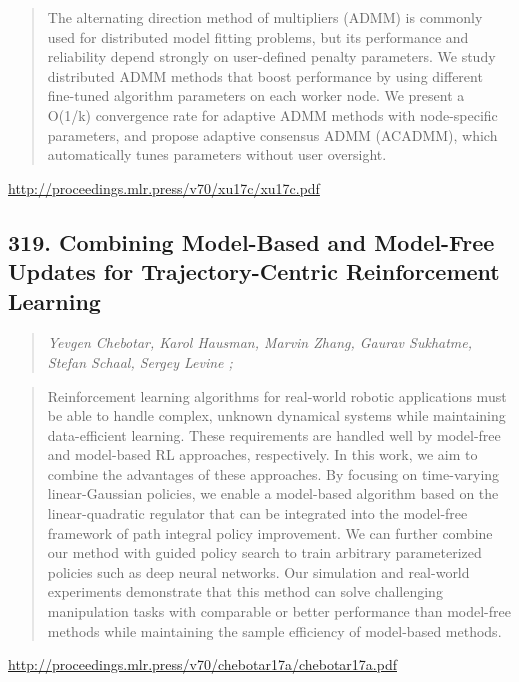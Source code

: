 \documentclass{article}
\begin{document}
\begin{quote}
    The alternating direction method of multipliers (ADMM) is commonly used for distributed model fitting problems, but its performance and reliability depend strongly on user-defined penalty parameters. We study distributed ADMM methods that boost performance by using different fine-tuned algorithm parameters on each worker node. We present a O(1/k) convergence rate for adaptive ADMM methods with node-specific parameters, and propose adaptive consensus ADMM (ACADMM), which automatically tunes parameters without user oversight.  \end{quote}

\href{http://proceedings.mlr.press/v70/xu17c/xu17c.pdf}{http://proceedings.mlr.press/v70/xu17c/xu17c.pdf}

\subsection{319. Combining Model-Based and Model-Free Updates for Trajectory-Centric Reinforcement Learning}

\begin{quote}
\footnotesize{\textit{Yevgen Chebotar, Karol Hausman, Marvin Zhang, Gaurav Sukhatme, Stefan Schaal, Sergey Levine ;}}
\end{quote}

\begin{quote}
    Reinforcement learning algorithms for real-world robotic applications must be able to handle complex, unknown dynamical systems while maintaining data-efficient learning. These requirements are handled well by model-free and model-based RL approaches, respectively. In this work, we aim to combine the advantages of these approaches. By focusing on time-varying linear-Gaussian policies, we enable a model-based algorithm based on the linear-quadratic regulator that can be integrated into the model-free framework of path integral policy improvement. We can further combine our method with guided policy search to train arbitrary parameterized policies such as deep neural networks. Our simulation and real-world experiments demonstrate that this method can solve challenging manipulation tasks with comparable or better performance than model-free methods while maintaining the sample efficiency of model-based methods.  \end{quote}

\href{http://proceedings.mlr.press/v70/chebotar17a/chebotar17a.pdf}{http://proceedings.mlr.press/v70/chebotar17a/chebotar17a.pdf}
\end{document}
